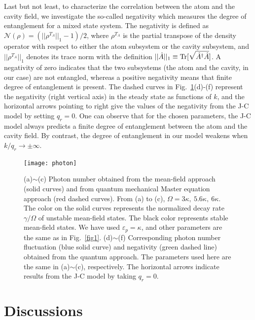 \documentclass[atoms,article,submit,moreauthors,dvi2pdf,12pt,a4paper]{mdpi}
\begin{document}
Last but not least, to characterize the correlation between the atom and the cavity field, we investigate the so-called negativity \cite{negativity} which measures the degree of entanglement for a mixed state system.
The negativity is defined as $\mathcal{N}(\rho)=(||\rho^{T_A}||_1-1)/2$, where $\rho^{T_A}$ is the partial transpose of the density operator with respect to either the atom subsystem or the cavity subsystem, and $||\rho^{T_A}||_1$ denotes its trace norm with the definition $||\hat{A}||_1 \equiv {\rm Tr}[\sqrt{\hat{A}^\dag \hat{A}} ]$. A negativity of zero indicates that the two subsystems (the atom and the cavity, in our case) are not entangled, whereas a positive negativity means that finite degree of entanglement is present. The dashed curves in Fig.~\ref{photon}(d)-(f) represent the negativity (right vertical axis) in the steady state as functions of $k$, and the horizontal arrows pointing to right give the values of the negativity from the J-C model by setting $q_r=0$. One can observe that for the chosen parameters, the J-C model always predicts a finite degree of entanglement between the atom and the cavity field. By contrast, the degree of entanglement in our model weakens when $k/q_r \rightarrow \pm \infty$.

\begin{figure}[htp]
\texttt{[image: photon]}
\caption{(a)$\sim$(c) Photon number obtained from the mean-field approach (solid curves) and from quantum mechanical Master equation approach (red dashed curves). From (a) to (c), $\Omega = 3\kappa,\ 5.6\kappa,\ 6\kappa$. The color on the solid curves represents the normalized decay rate $\gamma/\Omega$ of unstable mean-field states. The black color represents stable mean-field states. We have used $\varepsilon_p=\kappa$, and other parameters are the same as in Fig.~\ref{fig1}. (d)$\sim$(f) Corresponding photon number fluctuation (blue solid curve) and negativity (green dashed line) obtained from the quantum approach. The parameters used here are the same in (a)$\sim$(c), respectively. The horizontal arrows indicate results from the J-C model by taking $q_r=0$.
}\label{photon}
\end{figure}

\section{Discussions} \label{relation}
\end{document}
